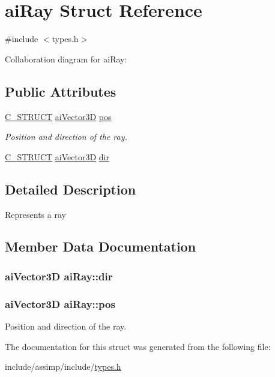 \hypertarget{structai_ray}{\section{ai\-Ray Struct Reference}
\label{structai_ray}
}


{\ttfamily \#include $<$types.\-h$>$}



Collaboration diagram for ai\-Ray\-:
\subsection*{Public Attributes}
\begin{DoxyCompactItemize}
\item 
\hyperlink{defs_8h_ab51df4230ceb602bbc1bc109c432a6a0}{C\-\_\-\-S\-T\-R\-U\-C\-T} \hyperlink{structai_vector3_d}{ai\-Vector3\-D} \hyperlink{structai_ray_a312f663a7d2580b1b3beb52ffd4ab4c9}{pos}
\begin{DoxyCompactList}\small\item\em Position and direction of the ray. \end{DoxyCompactList}\item 
\hyperlink{defs_8h_ab51df4230ceb602bbc1bc109c432a6a0}{C\-\_\-\-S\-T\-R\-U\-C\-T} \hyperlink{structai_vector3_d}{ai\-Vector3\-D} \hyperlink{structai_ray_a635d9120af2654716e5e7952d837282b}{dir}
\end{DoxyCompactItemize}


\subsection{Detailed Description}
Represents a ray 

\subsection{Member Data Documentation}
\hypertarget{structai_ray_a635d9120af2654716e5e7952d837282b}{
\subsubsection[{dir}]{ {\bf ai\-Vector3\-D} ai\-Ray\-::dir}}\label{structai_ray_a635d9120af2654716e5e7952d837282b}
\hypertarget{structai_ray_a312f663a7d2580b1b3beb52ffd4ab4c9}{
\subsubsection[{pos}]{ {\bf ai\-Vector3\-D} ai\-Ray\-::pos}}\label{structai_ray_a312f663a7d2580b1b3beb52ffd4ab4c9}


Position and direction of the ray. 



The documentation for this struct was generated from the following file\-:\begin{DoxyCompactItemize}
\item 
include/assimp/include/\hyperlink{types_8h}{types.\-h}\end{DoxyCompactItemize}

